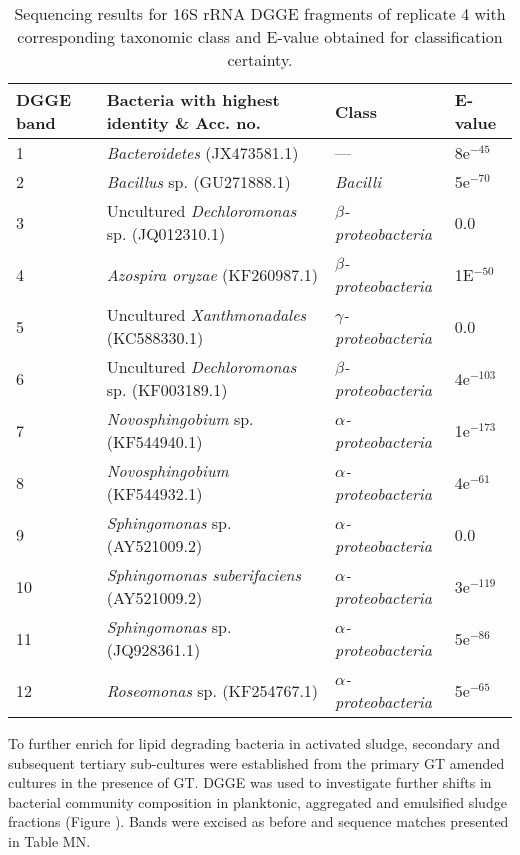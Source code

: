 \documentclass[twoside]{article}
\begin{document}
\begin{table}
\caption{Sequencing results for 16S rRNA DGGE fragments of replicate 4 with corresponding taxonomic class and E-value obtained for classification certainty.}
\begin{tabular}{ | l | p{7.8cm} | p{3cm} | l | }
\hline
DGGE band & Bacteria with highest identity \& Acc. no. & Class & E-value \\
\hline
1   &  \emph{Bacteroidetes} (JX473581.1) & --- & 8e$^{-45}$ \\
\hline
2  & \emph{Bacillus} sp. (GU271888.1) & \emph{Bacilli} & 5e$^{-70}$ \\
\hline
3 & Uncultured \emph{Dechloromonas} sp. (JQ012310.1) & \emph{$\beta$-proteobacteria} & 0.0 \\
\hline
4 & \emph{Azospira oryzae} (KF260987.1) & \emph{$\beta$-proteobacteria} & 1E$^{-50}$ \\
\hline
5 & Uncultured \emph{Xanthmonadales} (KC588330.1) & \emph{$\gamma$-proteobacteria} & 0.0 \\
\hline
6 & Uncultured \emph{Dechloromonas} sp. (KF003189.1) & \emph{$\beta$-proteobacteria} & 4e$^{-103}$ \\
\hline
7 & \emph{Novosphingobium} sp. (KF544940.1) & \emph{$\alpha$-proteobacteria} & 1e$^{-173}$ \\
\hline
8 & \emph{Novosphingobium} (KF544932.1) & \emph{$\alpha$-proteobacteria} & 4e$^{-61}$ \\
\hline
9 & \emph{Sphingomonas} sp. (AY521009.2) & \emph{$\alpha$-proteobacteria} & 0.0 \\
\hline
10 & \emph{Sphingomonas suberifaciens} (AY521009.2) & \emph{$\alpha$-proteobacteria} & 3e$^{-119}$ \\
\hline
11 & \emph{Sphingomonas} sp. (JQ928361.1) & \emph{$\alpha$-proteobacteria} & 5e$^{-86}$ \\
\hline
12 & \emph{Roseomonas} sp.  (KF254767.1) & \emph{$\alpha$-proteobacteria} & 5e$^{-65}$ \\
\hline
\end{tabular}

\end{table}
\FloatBarrier

To further enrich for lipid degrading bacteria in activated sludge, secondary and subsequent tertiary sub-cultures were established from the primary GT amended cultures in the presence of GT. DGGE was used to investigate further shifts in bacterial community composition in planktonic, aggregated and emulsified sludge fractions (Figure ). Bands were excised as before and sequence matches presented in Table MN. \\
\end{document}
